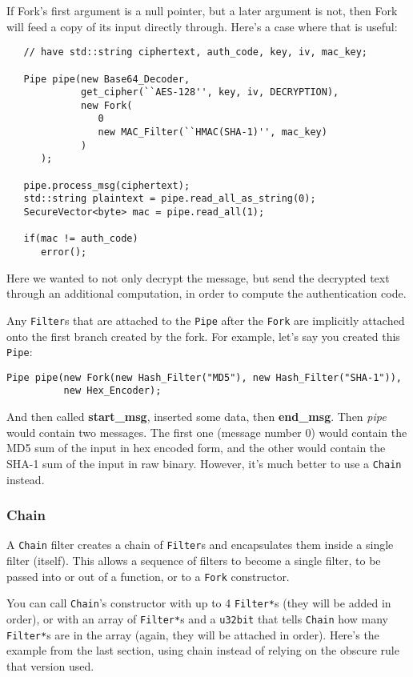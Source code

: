 \documentclass{article}
\newcommand{\function}[1]{\textbf{#1}}
\newcommand{\type}[1]{\texttt{#1}}
\renewcommand{\arg}[1]{\textsl{#1}}
\begin{document}
If Fork's first argument is a null pointer, but a later argument is
not, then Fork will feed a copy of its input directly through. Here's
a case where that is useful:

\begin{verbatim}
   // have std::string ciphertext, auth_code, key, iv, mac_key;

   Pipe pipe(new Base64_Decoder,
             get_cipher(``AES-128'', key, iv, DECRYPTION),
             new Fork(
                0
                new MAC_Filter(``HMAC(SHA-1)'', mac_key)
             )
      );

   pipe.process_msg(ciphertext);
   std::string plaintext = pipe.read_all_as_string(0);
   SecureVector<byte> mac = pipe.read_all(1);

   if(mac != auth_code)
      error();
\end{verbatim}

Here we wanted to not only decrypt the message, but send the decrypted
text through an additional computation, in order to compute the
authentication code.

Any \type{Filter}s that are attached to the \type{Pipe} after the
\type{Fork} are implicitly attached onto the first branch created by
the fork. For example, let's say you created this \type{Pipe}:

\begin{verbatim}
Pipe pipe(new Fork(new Hash_Filter("MD5"), new Hash_Filter("SHA-1")),
          new Hex_Encoder);
\end{verbatim}

And then called \function{start\_msg}, inserted some data, then
\function{end\_msg}. Then \arg{pipe} would contain two messages. The
first one (message number 0) would contain the MD5 sum of the input in
hex encoded form, and the other would contain the SHA-1 sum of the
input in raw binary. However, it's much better to use a \type{Chain}
instead.

\subsubsection{Chain}

A \type{Chain} filter creates a chain of \type{Filter}s and
encapsulates them inside a single filter (itself). This allows a
sequence of filters to become a single filter, to be passed into or
out of a function, or to a \type{Fork} constructor.

You can call \type{Chain}'s constructor with up to 4 \type{Filter*}s
(they will be added in order), or with an array of \type{Filter*}s and
a \type{u32bit} that tells \type{Chain} how many \type{Filter*}s are
in the array (again, they will be attached in order). Here's the
example from the last section, using chain instead of relying on the
obscure rule that version used.
\end{document}
